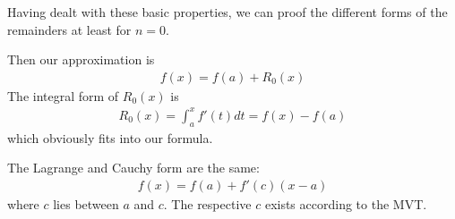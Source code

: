 Having dealt with these basic properties, we can proof the different forms of the remainders at least for $n=0$. 

Then our approximation is 
\begin{align*}
f(x) = f(a) + R_0(x)
\end{align*}
The integral form of $R_0(x)$ is 
\begin{align*}
R_0(x) = \int_a^x f'(t) dt = f(x) - f(a)
\end{align*}
which obviously fits into our formula.

The Lagrange and Cauchy form are the same:
\begin{align*}
f(x) = f(a) + f'(c)(x-a)
\end{align*}
where $c$ lies between $a$ and $c$. The respective $c$ exists according to the MVT.

\begin{comment}
For simplicity let us only proof the Taylor theorem with the Cauchy form of remainder: 
\begin{proof}
\begin{align*}
f(x) & = f(a) + (x-a) f(a) + \dots + \frac{(x-a)^n}{n!} f^{(n)} (a)  + R_n(x)\\
R_n(x) & = \frac{f^{(n+1)}(c) (x-a)(x-c)}{n!}
\end{align*}
It is useful to switch $a$ and $c$ 
\begin{align*}
f(a) = f(x) + (a-x)f(x) + \dots + \frac{(a-x)^n}{n!} f^{(n)}(x) + R_n(a) \\
R_n(a) = f^{(n+1)} \frac {c(a-x)(a-c)}{n!}
\end{align*}
Apply MVT to 
\begin{align*}
h(x) = f(x) + (a-x) f(x) + \dots + \frac{(a-x)^n}{n!} f^{(n)} (x) \\
h'(x) = (a-x) f''(x) + \frac{(a-x)^n}{n!} f^{(n+1)} (x)
\end{align*}
Apply MVT
\begin{align*}
h'c & = \frac{h(a) -h(x)}{a-x} \\
\frac{(a-c)^n}{n!}f^{(n+1)} (c) & = \frac{h(a) -h(x)}{a-x} \\
h(a) & = h(x) + \frac{(a-x)(a-c)}{n!} f^{(n+1)} (c) \\
f(a) & = h(x) + R_n(a)
\end{align*}
\end{proof}

Lagrange form:
Cauchy Mean Value Theorem (Generalization of the standard MVT).
\begin{align*}
\frac{f(b)-f(a)}{g(b)-g(a)} = \frac{f'(c)}{g'(c)} 
\end{align*}
\end{comment}


